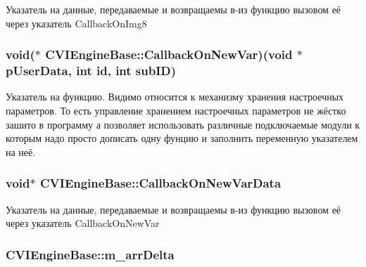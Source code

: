 Указатель на данные, передаваемые и возвращаемы в-\/из функцию вызовом её через указатель Callback\+On\+Img8 

\hypertarget{class_c_v_i_engine_base_ab3883b66e78478803c693b4ad2f5b0e7}{
\subsubsection[{Callback\+On\+New\+Var}]{\setlength{\rightskip}{0pt plus 5cm}void($\ast$ C\+V\+I\+Engine\+Base\+::\+Callback\+On\+New\+Var)(void $\ast$p\+User\+Data, int id, int sub\+I\+D)}}\label{class_c_v_i_engine_base_ab3883b66e78478803c693b4ad2f5b0e7}


Указатель на функцию. Видимо относится к механизму хранения настроечных параметров. То есть управление хранением настроечных параметров не жёстко зашито в программу а позволяет использовать различные подключаемые модули к которым надо просто дописать одну фунцию и заполнить переменную указателем на неё. 

\hypertarget{class_c_v_i_engine_base_aa0d4e70811444be165a4b9c2a4aa7aae}{
\subsubsection[{Callback\+On\+New\+Var\+Data}]{\setlength{\rightskip}{0pt plus 5cm}void$\ast$ C\+V\+I\+Engine\+Base\+::\+Callback\+On\+New\+Var\+Data}}\label{class_c_v_i_engine_base_aa0d4e70811444be165a4b9c2a4aa7aae}


Указатель на данные, передаваемые и возвращаемы в-\/из функцию вызовом её через указатель Callback\+On\+New\+Var 

\hypertarget{class_c_v_i_engine_base_abd1077e6704b0f6bbc788c4d3e7f150e}{
\subsubsection[{m\+\_\+arr\+Delta}]{ C\+V\+I\+Engine\+Base\+::m\+\_\+arr\+Delta}}\label{class_c_v_i_engine_base_abd1077e6704b0f6bbc788c4d3e7f150e}


